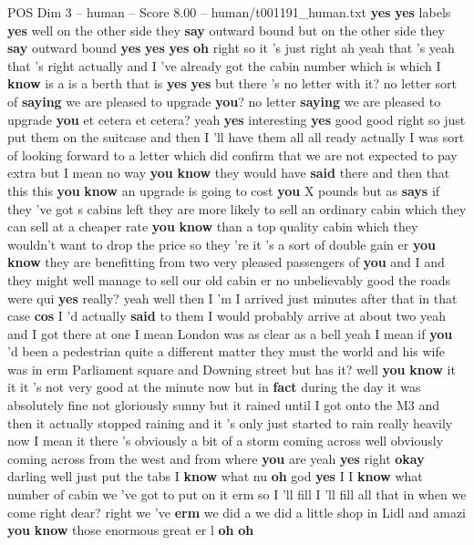 \begin{textsample}{POS Dim 3 – human – Score 8.00 – human/t001191\_human.txt}  \label{ex:f3_pos_009}
\textbf{yes} \textbf{yes} labels \textbf{yes} well on the other side they \textbf{say} outward bound but on the other side they \textbf{say} outward bound \textbf{yes} \textbf{yes} \textbf{yes} \textbf{oh} right so it 's just right ah yeah that 's yeah that 's right actually and I 've already got the cabin number which is which I \textbf{know} is a is a berth that is \textbf{yes} \textbf{yes} but there 's no letter with it? no letter sort of \textbf{saying} we are pleased to upgrade \textbf{you}? no letter \textbf{saying} we are pleased to upgrade \textbf{you} et cetera et cetera? yeah \textbf{yes} interesting \textbf{yes} good good right so just put them on the suitcase and then I 'll have them all all ready actually I was sort of looking forward to a letter which did confirm that we are not expected to pay extra but I mean no way \textbf{you} \textbf{know} they would have \textbf{said} there and then that this this \textbf{you} \textbf{know} an upgrade is going to cost \textbf{you} X pounds but as \textbf{says} if they 've got s cabins left they are more likely to sell an ordinary cabin which they can sell at a cheaper rate \textbf{you} \textbf{know} than a top quality cabin which they wouldn't want to drop the price so they 're it 's a sort of double gain er \textbf{you} \textbf{know} they are benefitting from two very pleased passengers of \textbf{you} and I and they might well manage to sell our old cabin er no unbelievably good the roads were qui \textbf{yes} really? yeah well then I 'm I arrived just minutes after that in that case \textbf{cos} I 'd actually \textbf{said} to them I would probably arrive at about two yeah and I got there at one I mean London was as clear as a bell yeah I mean if \textbf{you} 'd been a pedestrian quite a different matter they must the world and his wife was in erm Parliament square and Downing street but has it? well \textbf{you} \textbf{know} it it it 's not very good at the minute now but in \textbf{fact} during the day it was absolutely fine not gloriously sunny but it rained until I got onto the M3 and then it actually stopped raining and it 's only just started to rain really heavily now I mean it there 's obviously a bit of a storm coming across well obviously coming across from the west and from where \textbf{you} are yeah \textbf{yes} right \textbf{okay} darling well just put the tabs I \textbf{know} what nu \textbf{oh} god \textbf{yes} I I \textbf{know} what number of cabin we 've got to put on it erm so I 'll fill I 'll fill all that in when we come right dear? right we 've \textbf{erm} we did a we did a little shop in Lidl and amazi \textbf{you} \textbf{know} those enormous great er l \textbf{oh} \textbf{oh}

\end{textsample}
